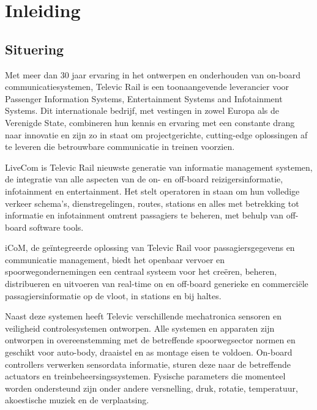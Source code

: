 \chapter{Inleiding}\label{hfdst:situering}
\section{Situering}
Met meer dan 30 jaar ervaring in het ontwerpen en onderhouden van on-board communicatiesystemen, Televic Rail is een toonaangevende leverancier voor Passenger Information Systems, Entertainment Systems and Infotainment Systems.
Dit internationale bedrijf, met vestingen in zowel Europa als de Verenigde State, combineren hun kennis en ervaring met een constante drang naar innovatie en zijn zo in staat om projectgerichte, cutting-edge oplossingen af te leveren die betrouwbare communicatie in treinen voorzien.

LiveCom is Televic Rail nieuwste generatie van informatie management systemen, de integratie van alle aspecten van de on- en off-board reizigersinformatie, infotainment en entertainment. 
Het stelt operatoren in staan om hun volledige verkeer schema's, dienstregelingen, routes, stations en alles met betrekking tot informatie en infotainment omtrent passagiers te beheren, met behulp van off-board software tools.

iCoM, de geïntegreerde oplossing van Televic Rail voor passagiersgegevens en communicatie management, biedt het openbaar vervoer en spoorwegondernemingen een centraal systeem voor het creëren, beheren, distribueren en uitvoeren van real-time on en off-board generieke en commerciële passagiersinformatie op de vloot, in stations en bij haltes.

Naast deze systemen heeft Televic verschillende mechatronica sensoren en veiligheid controlesystemen ontworpen.
Alle systemen en apparaten zijn ontworpen in overeenstemming met de betreffende spoorwegsector normen en geschikt voor auto-body, draaistel en as montage eisen te voldoen. 
On-board controllers verwerken sensordata informatie, sturen deze naar de betreffende actuators en treinbeheersingssystemen.
Fysische parameters die momenteel worden ondersteund zijn onder andere versnelling, druk, rotatie, temperatuur, akoestische muziek en de verplaatsing.

